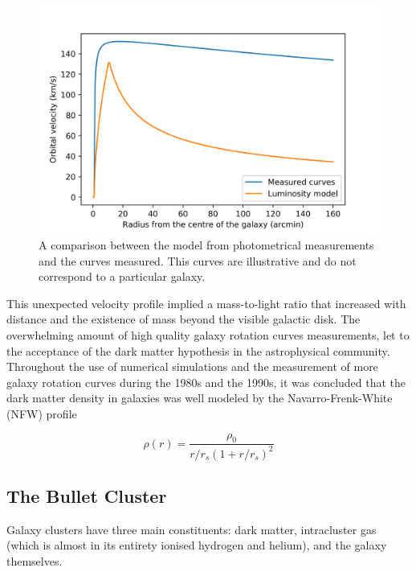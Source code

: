 \begin{figure}[H]
    \centering
    \includegraphics[scale=0.8]{imag/galaxyRotCurv.png}
    \caption{A comparison between the model from photometrical measurements and the curves measured. This curves are illustrative and do not correspond to a particular galaxy.}
    \label{galaxyCurve}
\end{figure}

This unexpected velocity profile implied a mass-to-light ratio that increased with distance and the existence of mass beyond the visible galactic disk\cite{theIsMassOutside}.
The overwhelming amount of high quality galaxy rotation curves measurements, let to the acceptance of the dark matter hypothesis in the astrophysical community.\\

Throughout the use of numerical simulations and the measurement of more galaxy rotation curves during the 1980s and the 1990s, it was concluded that the dark matter density in galaxies was well modeled by the Navarro-Frenk-White (NFW) profile\cite{FWN}\cite{mariangela}

\begin{equation}
\rho(r) = \frac{\rho_0}{r/r_s(1+r/r_s)^2}
\end{equation}


\subsection{The Bullet Cluster}
Galaxy clusters have three main constituents: dark matter, intracluster gas (which is almost in its entirety ionised hydrogen and helium), and the galaxy themselves.\cite{book:75345}\\


